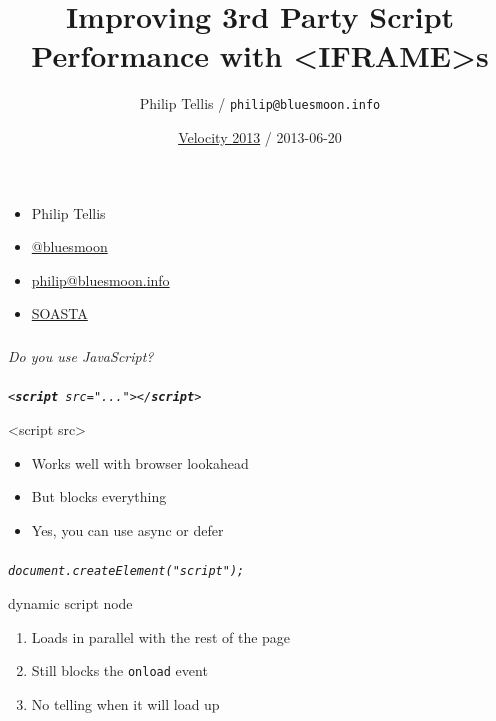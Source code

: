\documentclass{beamer}
\author{Philip Tellis / \texttt{philip@bluesmoon.info}}
\title{Improving 3rd Party Script Performance with <IFRAME>s}
\date{\href{http://velocityconf.com/velocity2013/public/schedule/detail/28313}{Velocity 2013} / 2013-06-20}
\newcommand{\innersplash}[1]{
  \begin{center}
    \Large \textrm{\textit{ #1 } }
  \end{center}
}
\newcommand{\splashslide}[2][{}]{
  \begin{frame}
  \frametitle{#1}
  \innersplash{#2}
  \end{frame}
}
\def\green<#1>#2{\textcolor<#1>{dark-green}{\textbf<#1>{#2}}}
\begin{document}
\begin{frame}
  \titlepage
\end{frame}

\begin{frame}
  \begin{itemize}
  \item Philip Tellis
  \item \href{http://twitter.com/bluesmoon}{@bluesmoon}
  \item \href{http://bluesmoon.info/}{philip@bluesmoon.info}
  \item \href{http://www.soasta.com/}{SOASTA}
  \end{itemize}
\end{frame}

\splashslide{Do you use JavaScript?}

\splashslide{\texttt{<\green<1>{script} src="..."></\green<1>{script}>}}

\begin{frame}{<script src>}
\begin{itemize}
  \item Works well with browser lookahead
  \item But blocks everything
  \item Yes, you can use async or defer
\end{itemize}
\end{frame}

\begin{frame}
\end{frame}

\begin{frame}
\end{frame}

\splashslide{\texttt{document.createElement("script");}}

\begin{frame}{dynamic script node}
\begin{enumerate}
  \item Loads in parallel with the rest of the page
  \item Still blocks the \texttt{onload} event
  \item No telling when it will load up
\end{enumerate}
\end{frame}
\end{document}
